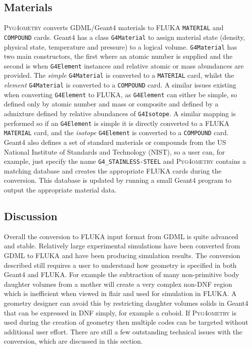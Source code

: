 \documentclass[final,5p,times,twocolumn]{elsarticle}
\newcommand{\pyinline}[1]{\lstinline[postbreak={}]{#1}}
\newcommand{\cpinline}[1]{\lstinline[postbreak={}]{#1}}
\newcommand{\fluka}[1]{\texttt{\MakeUppercase{#1}}}
\newcommand{\PYGEOMETRY}{\textsc{Pyg4ometry}}
\begin{document}
\subsection{Materials}
\PYGEOMETRY{} converts GDML/Geant4 materials to FLUKA \verb|MATERIAL| and \verb|COMPOUND| cards.
Geant4 has a class \cpinline{G4Material} to assign material state (density, physical state, temperature and pressure) 
to a logical volume. \cpinline{G4Material} has two main constructors, the first where an atomic number is supplied and 
the second is when \cpinline{G4Element} instances and relative atomic or mass abundances are provided. The {\em simple}
\cpinline{G4Material} is converted to a \fluka{material} card, whilst the {\em element} \cpinline{G4Material}  is converted to a 
\fluka{compound} card. A similar issues existing when converting \cpinline{G4Element} to FLUKA, as \cpinline{G4Element}
can either be simple, so defined only by atomic number and mass or composite and defined by a admixture defined by 
relative abundances of \cpinline{G4Isotope}. A similar mapping is performed so if an \cpinline{G4Element} is simple it is 
directly converted to a FLUKA \fluka{MATERIAL} card, and the {\it isotope} \cpinline{G4Element} is converted to a \fluka{compound}
card. Geant4 also defines a set of standard materials \cite{Geant4MaterialDB} or compounds from the US National Institute 
of Standards and Technology (NIST), so a user can, for example, just
specify the name \pyinline{G4_STAINLESS-STEEL} and \PYGEOMETRY{}  contains a matching database and creates the appropriate FLUKA 
cards during the conversion. This database is updated by running a small Geant4 program to output the appropriate
material data.

\subsection{Discussion}
Overall the conversion to FLUKA input format from GDML is quite 
advanced and stable. Relatively large experimental simulations 
have been converted from GDML to FLUKA and have been producing 
simulation results. The conversion described still requires a user to
understand how geometry is specified in both Geant4 and FLUKA. For 
example the subtraction of many non-primitive body daughter volumes from 
a mother will create a very complex non-DNF region which is inefficient when viewed in 
flair and used for simulation in FLUKA. A geometry designer can avoid this by
restricting daughter volumes solids in Geant4 that can be expressed in DNF simply,
for example a cuboid.  If \PYGEOMETRY{} is used during the creation of
 geometry then multiple codes can be targeted without additional user effort. 
There are still a few outstanding technical issues with the conversion, which are discussed 
in this section.
\end{document}
